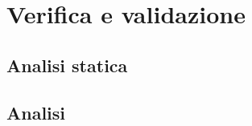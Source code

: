 
\chapter{Verifica e validazione}
\label{ch:verifica-validazione}
\section{Analisi statica}\label{sec:analisi-statica}
\section{Analisi}